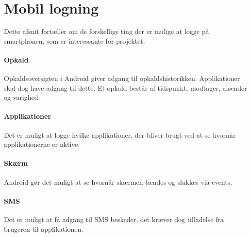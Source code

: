 \section{Mobil logning}\label{logning}
Dette afsnit fortæller om de forskellige ting der er mulige at logge på smartphonen, som er interessante for projektet.

\paragraph{Opkald}
Opkaldsoversigten i Android giver adgang til opkaldshistorikken.
Applikationer skal dog have adgang til dette.
Et opkald består af tidspunkt, modtager, afsender og varighed.

\paragraph{Applikationer}
Det er muligt at logge hvilke applikationer, der bliver brugt ved at se hvornår applikationerne er aktive.

\paragraph{Skærm}
Android gør det muligt at se hvornår skærmen tændes og slukkes via events.  

\paragraph{SMS}
Det er muligt at få adgang til SMS beskeder, det kræver dog tilladelse fra brugeren til applikationen.